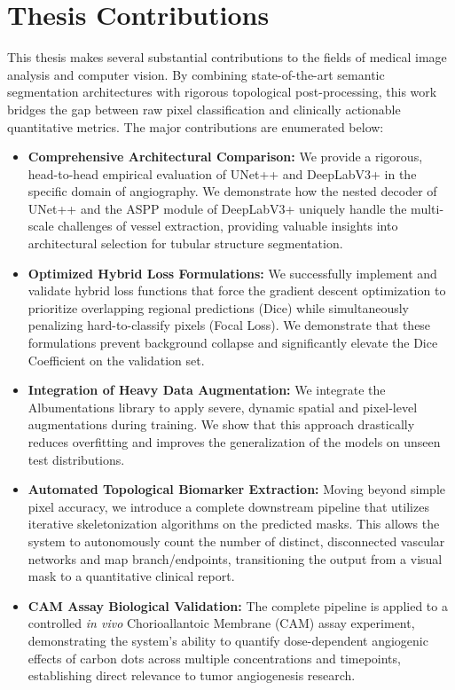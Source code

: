 \section{Thesis Contributions}
This thesis makes several substantial contributions to the fields of medical image analysis and computer vision. By combining state-of-the-art semantic segmentation architectures with rigorous topological post-processing, this work bridges the gap between raw pixel classification and clinically actionable quantitative metrics. The major contributions are enumerated below:

\begin{itemize}
    \item \textbf{Comprehensive Architectural Comparison:} We provide a rigorous, head-to-head empirical evaluation of UNet++ and DeepLabV3+ in the specific domain of angiography. We demonstrate how the nested decoder of UNet++ and the ASPP module of DeepLabV3+ uniquely handle the multi-scale challenges of vessel extraction, providing valuable insights into architectural selection for tubular structure segmentation.
    \item \textbf{Optimized Hybrid Loss Formulations:} We successfully implement and validate hybrid loss functions that force the gradient descent optimization to prioritize overlapping regional predictions (Dice) while simultaneously penalizing hard-to-classify pixels (Focal Loss). We demonstrate that these formulations prevent background collapse and significantly elevate the Dice Coefficient on the validation set.
    \item \textbf{Integration of Heavy Data Augmentation:} We integrate the Albumentations library to apply severe, dynamic spatial and pixel-level augmentations during training. We show that this approach drastically reduces overfitting and improves the generalization of the models on unseen test distributions.
    \item \textbf{Automated Topological Biomarker Extraction:} Moving beyond simple pixel accuracy, we introduce a complete downstream pipeline that utilizes iterative skeletonization algorithms on the predicted masks. This allows the system to autonomously count the number of distinct, disconnected vascular networks and map branch/endpoints, transitioning the output from a visual mask to a quantitative clinical report.
    \item \textbf{CAM Assay Biological Validation:} The complete pipeline is applied to a controlled \textit{in vivo} Chorioallantoic Membrane (CAM) assay experiment, demonstrating the system's ability to quantify dose-dependent angiogenic effects of carbon dots across multiple concentrations and timepoints, establishing direct relevance to tumor angiogenesis research.
\end{itemize}

